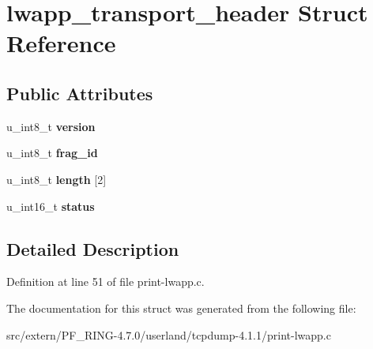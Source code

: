 \hypertarget{structlwapp__transport__header}{
\section{lwapp\_\-transport\_\-header Struct Reference}
\label{structlwapp__transport__header}
}
\subsection*{Public Attributes}
\begin{DoxyCompactItemize}
\item 
\hypertarget{structlwapp__transport__header_a5ec774421006aa3de187d15319aedc23}{
u\_\-int8\_\-t {\bfseries version}}
\label{structlwapp__transport__header_a5ec774421006aa3de187d15319aedc23}

\item 
\hypertarget{structlwapp__transport__header_ac8345a2407ce4419e8779f5ae12b08f9}{
u\_\-int8\_\-t {\bfseries frag\_\-id}}
\label{structlwapp__transport__header_ac8345a2407ce4419e8779f5ae12b08f9}

\item 
\hypertarget{structlwapp__transport__header_ae090399898e70bd01dc4adf0db71a482}{
u\_\-int8\_\-t {\bfseries length} \mbox{[}2\mbox{]}}
\label{structlwapp__transport__header_ae090399898e70bd01dc4adf0db71a482}

\item 
\hypertarget{structlwapp__transport__header_a9c2e9e134e6fe4eafba4f43d80f726d4}{
u\_\-int16\_\-t {\bfseries status}}
\label{structlwapp__transport__header_a9c2e9e134e6fe4eafba4f43d80f726d4}

\end{DoxyCompactItemize}


\subsection{Detailed Description}


Definition at line 51 of file print-\/lwapp.c.



The documentation for this struct was generated from the following file:\begin{DoxyCompactItemize}
\item 
src/extern/PF\_\-RING-\/4.7.0/userland/tcpdump-\/4.1.1/print-\/lwapp.c\end{DoxyCompactItemize}
